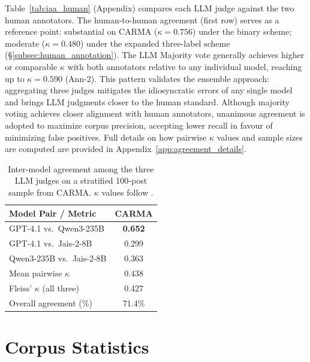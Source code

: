 \documentclass[11pt]{article}
\begin{document}
Table~\ref{tab:iaa_human} (Appendix) compares each LLM judge against the two human
annotators. The human-to-human agreement (first row) serves as a
reference point: substantial on CARMA ($\kappa = 0.756$) under the
binary scheme; moderate ($\kappa = 0.480$) under the expanded
three-label scheme (§\ref{subsec:human_annotation}). The LLM Majority vote generally achieves higher or comparable
$\kappa$ with both annotators relative to any individual model, reaching
up to $\kappa = 0.590$ (Ann-2). This pattern validates the ensemble approach: aggregating
three judges mitigates the idiosyncratic errors of any single model and
brings LLM judgments closer to the human standard. Although majority
voting achieves closer alignment with human annotators, unanimous
agreement is adopted to maximize corpus precision, accepting lower
recall in favour of minimizing false positives. Full details on how pairwise $\kappa$ values and
sample sizes are computed are provided in
Appendix~\ref{app:agreement_details}.

\begin{table}[h]
\centering
\small
\begin{tabular}{lc}
\toprule
\textbf{Model Pair / Metric} & \textbf{CARMA} \\
\midrule
GPT-4.1 vs.\ Qwen3-235B       & \textbf{0.652} \\
GPT-4.1 vs.\ Jais-2-8B        & 0.299          \\
Qwen3-235B vs.\ Jais-2-8B     & 0.363          \\
\midrule
Mean pairwise $\kappa$         & 0.438          \\
Fleiss' $\kappa$ (all three)   & 0.427          \\
\midrule
Overall agreement (\%)         & 71.4\%         \\
\bottomrule
\end{tabular}
\caption{Inter-model agreement among the three LLM judges on
a stratified 100-post sample from CARMA.
$\kappa$ values follow \citet{landis1977measurement}.}
\label{tab:iaa}
\end{table}



\section{Corpus Statistics}
\label{sec:corpus}
\end{document}
